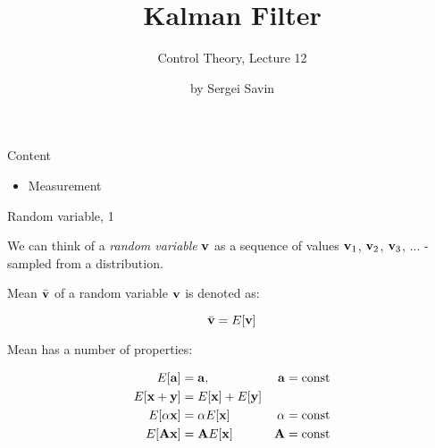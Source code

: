 \documentclass{beamer}
\title{Kalman Filter}
\subtitle{Control Theory, Lecture 12}
\author{by Sergei Savin}
\date{\mydate}
\begin{document}
\maketitle



\begin{frame}{Content}
\begin{itemize}
\item Measurement
\end{itemize}
\end{frame}




\begin{frame}{Random variable, 1}
\begin{flushleft}

We can think of a \emph{random variable} $\mathbf{v}$ as a sequence of values $\mathbf{v}_1$, $\mathbf{v}_2$, $\mathbf{v}_3$, ... - sampled from a distribution.

\bigskip

Mean $\bar{\mathbf{v}}$ of a random variable $\mathbf{v}$ is denoted as:

\begin{equation}
	\bar{\mathbf{v}} = E[\mathbf{v}]
\end{equation}

Mean has a number of properties:

\begin{align}
	E[\mathbf{a}] &= \mathbf{a}, & \mathbf{a}= \text{const} \\
	E[\mathbf{x}+\mathbf{y}] &= E[\mathbf{x}] + E[\mathbf{y}] &\\
	E[\alpha \mathbf{x}] &= \alpha  E[\mathbf{x}]  & \alpha = \text{const}\\
	E[\mathbf{A} \mathbf{x}] &= \mathbf{A}  E[\mathbf{x}] & \mathbf{A} = \text{const}
\end{align}


\end{flushleft}
\end{frame}
\end{document}
